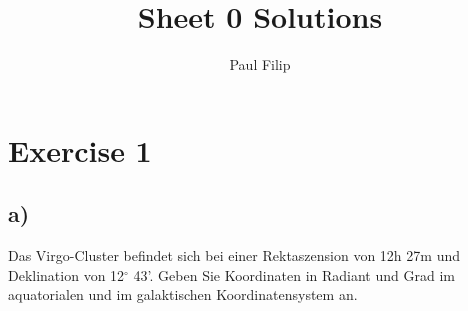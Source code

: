 \documentclass{scrartcl}
\title{Sheet 0 Solutions}
\author{Paul Filip}
\begin{document}
\maketitle

\section*{Exercise 1}

\subsection*{a)}
Das Virgo-Cluster befindet sich bei einer Rektaszension von 12h 27m und Deklination von 12$^\circ$ 43'.
Geben Sie Koordinaten in Radiant und Grad im aquatorialen und im galaktischen Koordinatensystem an.

\vspace{0.5cm}

\end{document}
